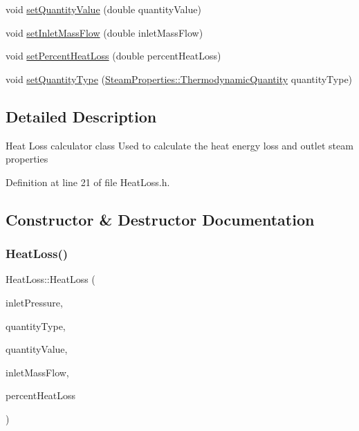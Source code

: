 \begin{DoxyCompactItemize}
void \hyperlink{class_heat_loss_ae6b6c4ac28471d7bc94e3886c48a90bd}{set\+Quantity\+Value} (double quantity\+Value)
\item 
void \hyperlink{class_heat_loss_ac4154dc9922b6ddf3f2e7a10cc64c61f}{set\+Inlet\+Mass\+Flow} (double inlet\+Mass\+Flow)
\item 
void \hyperlink{class_heat_loss_a2a4a80b16c1f975e194ae466b20d46bd}{set\+Percent\+Heat\+Loss} (double percent\+Heat\+Loss)
\item 
void \hyperlink{class_heat_loss_a7c125f1137f31eba8826a1aa3b905290}{set\+Quantity\+Type} (\hyperlink{class_steam_properties_ae0294bedf7d178c2d8fb6aed0f62fbff}{Steam\+Properties\+::\+Thermodynamic\+Quantity} quantity\+Type)
\end{DoxyCompactItemize}


\subsection{Detailed Description}
Heat Loss calculator class Used to calculate the heat energy loss and outlet steam properties 

Definition at line 21 of file Heat\+Loss.\+h.



\subsection{Constructor \& Destructor Documentation}
\mbox{\label{class_heat_loss_a1c1bba4ef783d97e2ed63f39f625e82f}} 
\subsubsection{\texorpdfstring{Heat\+Loss()}{HeatLoss()}}
{\footnotesize\ttfamily Heat\+Loss\+::\+Heat\+Loss (\begin{DoxyParamCaption}\item[{double}]{inlet\+Pressure,  }\item[{\hyperlink{class_steam_properties_ae0294bedf7d178c2d8fb6aed0f62fbff}{Steam\+Properties\+::\+Thermodynamic\+Quantity}}]{quantity\+Type,  }\item[{double}]{quantity\+Value,  }\item[{double}]{inlet\+Mass\+Flow,  }\item[{double}]{percent\+Heat\+Loss }\end{DoxyParamCaption})}


